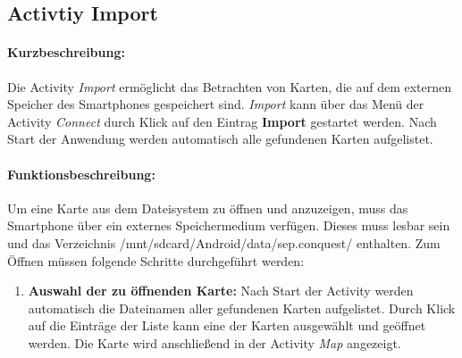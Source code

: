\documentclass[10pt,a4paper]{article}
\begin{document}
	\subsection{Activtiy Import}
		\paragraph*{Kurzbeschreibung:}
		Die Activity \textit{Import} erm\"oglicht das Betrachten von Karten, die auf dem externen Speicher des Smartphones gespeichert sind.
		\textit{Import} kann über das Men\"u der Activity \textit{Connect} durch Klick auf den Eintrag \textbf{Import} gestartet werden. Nach Start
		der Anwendung werden automatisch alle gefundenen Karten aufgelistet. 

		\paragraph*{Funktionsbeschreibung:}
		Um eine Karte aus dem Dateisystem zu \"offnen und anzuzeigen, muss das Smartphone über ein externes Speichermedium verfügen. Dieses muss
		lesbar sein und das Verzeichnis /mnt/sdcard/Android/data/sep.conquest/ enthalten. Zum Öffnen m\"ussen folgende Schritte durchgef\"uhrt
		werden:
		\begin{enumerate}
 			\item \textbf{Auswahl der zu \"offnenden Karte:} Nach Start der Activity werden automatisch die Dateinamen aller gefundenen Karten
 			aufgelistet. Durch Klick auf die Eintr\"age der Liste kann eine der Karten ausgewählt und geöffnet werden. Die Karte wird anschließend in
 			der Activity \textit{Map} angezeigt. \\
 		\end{enumerate}
\end{document}
